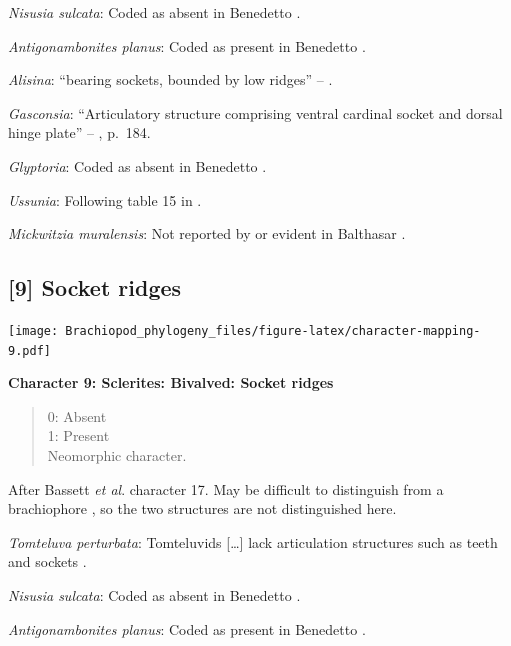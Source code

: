 \documentclass[]{book}
\theoremstyle{definition}
\theoremstyle{definition}
\theoremstyle{definition}
\theoremstyle{remark}
\begin{document}
\emph{Nisusia sulcata}: Coded as absent in Benedetto
\citeyearpar{Benedetto2009iChaniella}.

\emph{Antigonambonites planus}: Coded as present in Benedetto
\citeyearpar{Benedetto2009iChaniella}.

\emph{Alisina}: ``bearing sockets, bounded by low ridges'' --
\citet{Williams2000BrachiopodaLinguliformea}.

\emph{Gasconsia}: ``Articulatory structure comprising ventral cardinal
socket and dorsal hinge plate'' --
\citet{Williams2000BrachiopodaLinguliformea}, p.~184.

\emph{Glyptoria}: Coded as absent in Benedetto
\citeyearpar{Benedetto2009iChaniella}.

\emph{Ussunia}: Following table 15 in
\citet{Williams2000BrachiopodaLinguliformea}.

\emph{Mickwitzia muralensis}: Not reported by or evident in Balthasar
\citeyearpar{Balthasar2004Shellstructure}.

\hypertarget{socket-ridges}{%
\subsection*{{[}9{]} Socket ridges}\label{socket-ridges}}

\texttt{[image: Brachiopod\_phylogeny\_files/figure-latex/character-mapping-9.pdf]}

\textbf{Character 9: Sclerites: Bivalved: Socket ridges}

\begin{quote}
0: Absent\\
1: Present\\
Neomorphic character.
\end{quote}

After Bassett \emph{et al}.
\citeyearpar{Bassett2001Functionalmorphology} character 17. May be
difficult to distinguish from a brachiophore \citep[see Fig 323
in][]{Williams1997BrachiopodaRevised}, so the two structures are not
distinguished here.

\emph{Tomteluva perturbata}: Tomteluvids {[}\ldots{}{]} lack
articulation structures such as teeth and sockets
\citep{Streng2016Anew}.

\emph{Nisusia sulcata}: Coded as absent in Benedetto
\citeyearpar{Benedetto2009iChaniella}.

\emph{Antigonambonites planus}: Coded as present in Benedetto
\citeyearpar{Benedetto2009iChaniella}.
\end{document}
